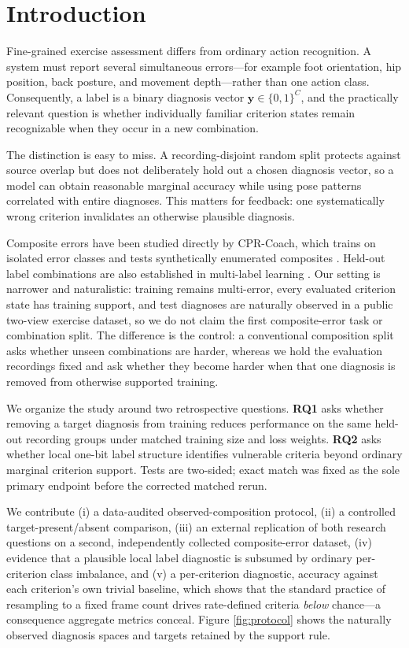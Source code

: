 \documentclass[conference,a4paper]{IEEEtran}
\begin{document}
\section{Introduction}
Fine-grained exercise assessment differs from ordinary action recognition. A
system must report several simultaneous errors---for example foot orientation,
hip position, back posture, and movement depth---rather than one action class.
Consequently, a label is a binary diagnosis vector
$\mathbf y\in\{0,1\}^{C}$, and the practically relevant question is whether
individually familiar criterion states remain recognizable when they occur in a
new combination.

The distinction is easy to miss. A recording-disjoint random split protects
against source overlap but does not deliberately hold out a chosen diagnosis
vector, so a model can obtain reasonable marginal accuracy while using pose
patterns correlated with entire diagnoses. This matters for feedback: one
systematically wrong criterion invalidates an otherwise plausible diagnosis.

Composite errors have been studied directly by CPR-Coach, which trains on
isolated error classes and tests synthetically enumerated composites
\cite{wang2024cpr}. Held-out label combinations are also established in
multi-label learning \cite{chai2024compositional}. Our setting is narrower and
naturalistic: training remains multi-error, every evaluated criterion state has
training support, and test diagnoses are naturally observed in a public
two-view exercise dataset, so we do not claim the first composite-error task
or combination split. The difference is the control: a conventional composition
split asks whether unseen combinations are harder, whereas we hold the
evaluation recordings fixed and ask whether they become harder when that one
diagnosis is removed from otherwise supported training.

We organize the study around two retrospective questions. \textbf{RQ1} asks
whether removing a target diagnosis from training reduces performance on the
same held-out recording groups under matched training size and loss weights.
\textbf{RQ2} asks whether local one-bit label structure identifies vulnerable
criteria beyond ordinary marginal criterion support. Tests are two-sided; exact
match was fixed as the sole primary endpoint before the corrected matched rerun.

We contribute (i) a data-audited observed-composition protocol, (ii) a
controlled target-present/absent comparison, (iii) an external replication of
both research questions on a second, independently collected composite-error
dataset, (iv) evidence that a plausible local label diagnostic is subsumed by
ordinary per-criterion class imbalance, and (v) a per-criterion diagnostic,
accuracy against each criterion's own trivial baseline, which shows that the
standard practice of resampling to a fixed frame count drives rate-defined
criteria \emph{below} chance---a consequence aggregate metrics conceal. Figure
\ref{fig:protocol} shows the naturally observed diagnosis spaces and targets
retained by the support rule.
\end{document}
